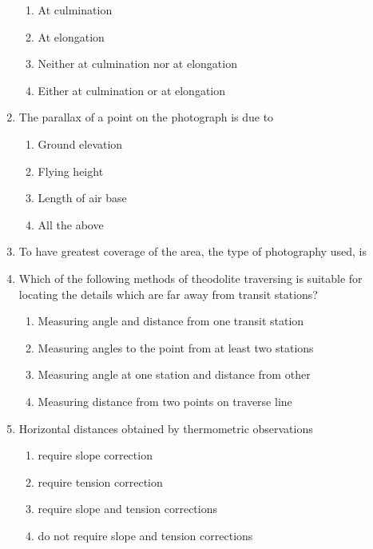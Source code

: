 \documentclass[11pt,a4paper]{article}
\begin{document}
\begin{enumerate}
\begin{enumerate}[label=\Alph*.]
\item{At culmination}
\item{At elongation}
\item{Neither at culmination nor at elongation}
\item{Either at culmination or at elongation}
\end{enumerate}
\item{The parallax of a point on the photograph is due to}
\begin{enumerate}[label=\Alph*.]
\item{Ground elevation}
\item{Flying height}
\item{Length of air base}
\item{All the above}
\end{enumerate}
\item{To have greatest coverage of the area, the type of photography used, is}
\\
\item{Which of the following methods of theodolite traversing is suitable for locating the details which are far away from transit stations?}
\begin{enumerate}[label=\Alph*.]
\item{Measuring angle and distance from one transit station}
\item{Measuring angles to the point from at least two stations}
\item{Measuring angle at one station and distance from other}
\item{Measuring distance from two points on traverse line}
\end{enumerate}
\item{Horizontal distances obtained by thermometric observations}
\begin{enumerate}[label=\Alph*.]
\item{require slope correction}
\item{require tension correction}
\item{require slope and tension corrections}
\item{do not require slope and tension corrections}

\end{enumerate}
\end{enumerate}
\end{document}
